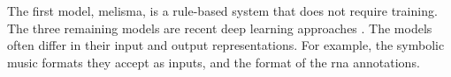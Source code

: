 
The first model, \gls{melisma}, is a rule-based system that
does not require training. The three remaining models are
recent deep learning approaches \parencite{chen2021attend,
micchi2021deep, mcleod2021modular}. The models often differ
in their input and output representations. For example, the
symbolic music formats they accept as inputs, and the format
of the \gls{rna} annotations. 


